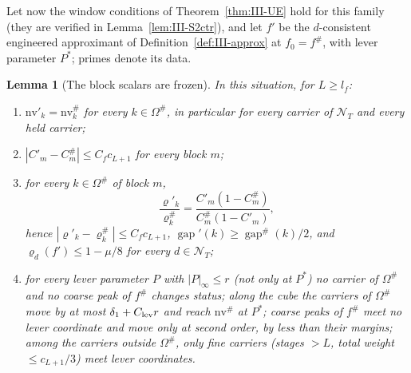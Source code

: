 \documentclass[10pt]{amsart}
\newtheorem{lemma}[theorem]{Lemma}
\theoremstyle{definition}
\theoremstyle{remark}
\newcommand{\gap}{\operatorname{gap}}
\begin{document}
Let now the window conditions of Theorem~\ref{thm:III-UE} hold for this
family (they are verified in Lemma~\ref{lem:III-S2ctr}), and let $f'$ be the
$d$-consistent engineered approximant of Definition~\ref{def:III-approx} at
$f_0=f^\#$, with lever parameter $P^*$; primes denote its data.

\begin{lemma}[The block scalars are frozen]\label{lem:III-PM}
In this situation, for $L\ge l_f$:
\begin{enumerate}
\item[(i)] $\mathrm{nv}'_k=\mathrm{nv}^\#_k$ for every $k\in\Omega^\#$, in particular for
every carrier of $\mathcal N_T$ and every held carrier;
\item[(ii)] $|C'_m-C^\#_m|\le C_fc_{L+1}$ for every block $m$;
\item[(iii)] for every $k\in\Omega^\#$ of block $m$,
\[
 \frac{\varrho'_k}{\varrho^\#_k}=\frac{C'_m(1-C^\#_m)}{C^\#_m(1-C'_m)},
\]
hence $|\varrho'_k-\varrho^\#_k|\le C_fc_{L+1}$, $\gap'(k)\ge\gap^\#(k)/2$, and
$\varrho_d(f')\le1-\mu/8$ for every $d\in\mathcal N_T$;
\item[(iv)] for every lever parameter $P$ with $|P|_\infty\le r$
\textup{(}not only at $P^*$\textup{)} no carrier of $\Omega^\#$ and no coarse peak of
$f^\#$ changes status; along the cube the carriers of $\Omega^\#$ move by at
most $\delta_1+C_{\rm lev}r$ and reach $\mathrm{nv}^\#$ at $P^*$; coarse peaks
of $f^\#$ meet no lever coordinate and move only at second order, by less
than their margins; among the carriers outside $\Omega^\#$, only fine
carriers \textup{(}stages $>L$, total weight $\le c_{L+1}/3$\textup{)} meet lever
coordinates.
\end{enumerate}
\end{lemma}
\end{document}
